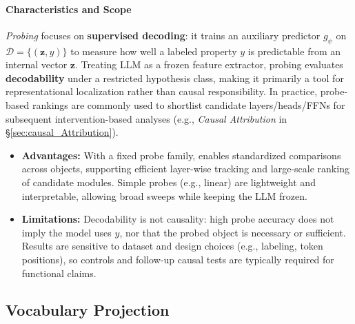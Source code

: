 \documentclass[11pt,letterpaper]{mystyle}
\begin{document}
\paragraph{Characteristics and Scope}
\textit{Probing} focuses on \textbf{supervised decoding}: it trains an auxiliary predictor $g_{\psi}$ on $\mathcal{D}=\{(\mathbf{z},y)\}$ to measure how well a labeled property $y$ is predictable from an internal vector $\mathbf{z}$.
Treating LLM as a frozen feature extractor, probing evaluates \textbf{decodability} under a restricted hypothesis class, making it primarily a tool for representational localization rather than causal responsibility.
In practice, probe-based rankings are commonly used to shortlist candidate layers/heads/FFNs for subsequent intervention-based analyses (e.g., \textit{Causal Attribution} in \S\ref{sec:causal_Attribution}).

\begin{itemize}[leftmargin=*]
    \item \textbf{Advantages:}
    With a fixed probe family,  enables standardized comparisons across objects, supporting efficient layer-wise tracking and large-scale ranking of candidate modules.
    Simple probes (e.g., linear) are lightweight and interpretable, allowing broad sweeps while keeping the LLM frozen.

    \item \textbf{Limitations:}
    Decodability is not causality: high probe accuracy does not imply the model uses $y$, nor that the probed object is necessary or sufficient.
    Results are sensitive to dataset and design choices (e.g., labeling, token positions), so controls and follow-up causal tests are typically required for functional claims.
\end{itemize}

\subsection{Vocabulary Projection}
\label{sec:vocab_project}
\end{document}
